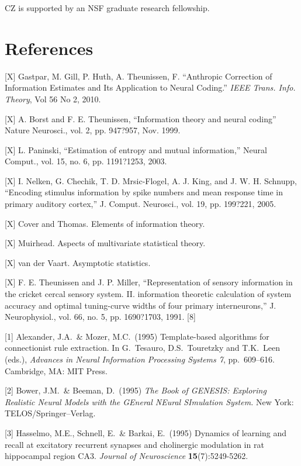 \documentclass{article}
\begin{document}
CZ is supported by an NSF graduate research fellowship.

\section*{References}

\small

[X] Gastpar, M.  Gill, P.  Huth, A.  Theunissen, F. ``Anthropic Correction of Information Estimates and Its Application to Neural Coding.'' \emph{IEEE Trans. Info. Theory}, Vol 56 No 2, 2010.

[X] A. Borst and F. E. Theunissen, ``Information theory and neural coding''
Nature Neurosci., vol. 2, pp. 947?957, Nov. 1999.

[X] L. Paninski, ``Estimation of entropy and mutual information,'' Neural
Comput., vol. 15, no. 6, pp. 1191?1253, 2003.

[X] I. Nelken, G. Chechik, T. D. Mrsic-Flogel, A. J. King, and J. W. H.
Schnupp, ``Encoding stimulus information by spike numbers and mean
response time in primary auditory cortex,'' J. Comput. Neurosci., vol.
19, pp. 199?221, 2005.

[X] Cover and Thomas.  Elements of information theory.

[X]  Muirhead.  Aspects of multivariate statistical theory.

[X] van der Vaart.  Asymptotic statistics.

[X] F. E. Theunissen and J. P. Miller, ``Representation of sensory information in the cricket cercal sensory system. II. information theoretic calculation of system accuracy and optimal tuning-curve widths of four primary interneurons,'' J. Neurophysiol., vol. 66, no. 5, pp. 1690?1703, 1991.
[8]

[1] Alexander, J.A.\ \& Mozer, M.C.\ (1995) Template-based algorithms
for connectionist rule extraction. In G.\ Tesauro, D.S.\ Touretzky and
T.K.\ Leen (eds.), {\it Advances in Neural Information Processing
  Systems 7}, pp.\ 609--616. Cambridge, MA: MIT Press.

[2] Bower, J.M.\ \& Beeman, D.\ (1995) {\it The Book of GENESIS:
  Exploring Realistic Neural Models with the GEneral NEural SImulation
  System.}  New York: TELOS/Springer--Verlag.

[3] Hasselmo, M.E., Schnell, E.\ \& Barkai, E.\ (1995) Dynamics of
learning and recall at excitatory recurrent synapses and cholinergic
modulation in rat hippocampal region CA3. {\it Journal of
  Neuroscience} {\bf 15}(7):5249-5262.
\end{document}
